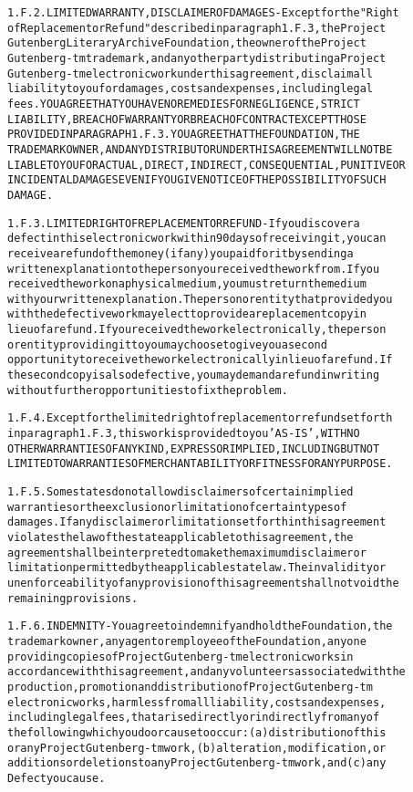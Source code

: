 \documentclass[12pt]{book}[2005/09/16]
\newenvironment{PGtext}{%
\begin{alltt}
%****
\fontsize{8.1}{10}\ttfamily\selectfont}%
{\end{alltt}}
\begin{document}
\begin{PGtext}
1.F.2. LIMITED WARRANTY, DISCLAIMER OF DAMAGES - Except for the "Right
of Replacement or Refund" described in paragraph 1.F.3, the Project
Gutenberg Literary Archive Foundation, the owner of the Project
Gutenberg-tm trademark, and any other party distributing a Project
Gutenberg-tm electronic work under this agreement, disclaim all
liability to you for damages, costs and expenses, including legal
fees. YOU AGREE THAT YOU HAVE NO REMEDIES FOR NEGLIGENCE, STRICT
LIABILITY, BREACH OF WARRANTY OR BREACH OF CONTRACT EXCEPT THOSE
PROVIDED IN PARAGRAPH 1.F.3. YOU AGREE THAT THE FOUNDATION, THE
TRADEMARK OWNER, AND ANY DISTRIBUTOR UNDER THIS AGREEMENT WILL NOT BE
LIABLE TO YOU FOR ACTUAL, DIRECT, INDIRECT, CONSEQUENTIAL, PUNITIVE OR
INCIDENTAL DAMAGES EVEN IF YOU GIVE NOTICE OF THE POSSIBILITY OF SUCH
DAMAGE.

1.F.3. LIMITED RIGHT OF REPLACEMENT OR REFUND - If you discover a
defect in this electronic work within 90 days of receiving it, you can
receive a refund of the money (if any) you paid for it by sending a
written explanation to the person you received the work from. If you
received the work on a physical medium, you must return the medium
with your written explanation. The person or entity that provided you
with the defective work may elect to provide a replacement copy in
lieu of a refund. If you received the work electronically, the person
or entity providing it to you may choose to give you a second
opportunity to receive the work electronically in lieu of a refund. If
the second copy is also defective, you may demand a refund in writing
without further opportunities to fix the problem.

1.F.4. Except for the limited right of replacement or refund set forth
in paragraph 1.F.3, this work is provided to you 'AS-IS', WITH NO
OTHER WARRANTIES OF ANY KIND, EXPRESS OR IMPLIED, INCLUDING BUT NOT
LIMITED TO WARRANTIES OF MERCHANTABILITY OR FITNESS FOR ANY PURPOSE.

1.F.5. Some states do not allow disclaimers of certain implied
warranties or the exclusion or limitation of certain types of
damages. If any disclaimer or limitation set forth in this agreement
violates the law of the state applicable to this agreement, the
agreement shall be interpreted to make the maximum disclaimer or
limitation permitted by the applicable state law. The invalidity or
unenforceability of any provision of this agreement shall not void the
remaining provisions.

1.F.6. INDEMNITY - You agree to indemnify and hold the Foundation, the
trademark owner, any agent or employee of the Foundation, anyone
providing copies of Project Gutenberg-tm electronic works in
accordance with this agreement, and any volunteers associated with the
production, promotion and distribution of Project Gutenberg-tm
electronic works, harmless from all liability, costs and expenses,
including legal fees, that arise directly or indirectly from any of
the following which you do or cause to occur: (a) distribution of this
or any Project Gutenberg-tm work, (b) alteration, modification, or
additions or deletions to any Project Gutenberg-tm work, and (c) any
Defect you cause.


\end{PGtext}
\end{document}
